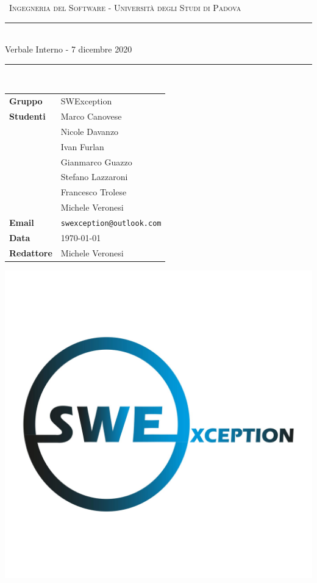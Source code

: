\documentclass[12pt,italian,a4paper]{article}
\begin{document}
	
	
	\begin{titlepage}
		\clearpage\thispagestyle{empty}
		\centering
		\vspace{1cm}
		
		{\
			\textsc{Ingegneria del Software - Università degli Studi di Padova}
		}
		\vspace{2.5cm}
		
		\rule{\linewidth}{2mm} \\[0.8cm]
		{ \LARGE \sc Verbale Interno - 7 dicembre 2020}\\[0.55cm]
		\rule{\linewidth}{0.6mm} \\[3.4cm]
		
		\hspace{2cm}
		\begin{tabular}{l p{5cm}}
			\textbf{Gruppo} & SWException \\[10pt]
			\textbf{Studenti} & Marco Canovese \\ & Nicole Davanzo \\ & Ivan Furlan \\ & Gianmarco Guazzo \\ & Stefano Lazzaroni \\ & Francesco Trolese \\ & Michele Veronesi \\[10pt]
			\textbf{Email} & \texttt{swexception@outlook.com} \\[10pt]
			\textbf{Data} & \today \\
			\textbf{Redattore} & Michele Veronesi       
		\end{tabular}
		
		
		\vfill
		\centering \includegraphics[scale=0.17]{logo.jpg}
	\end{titlepage}
	
\end{document}
